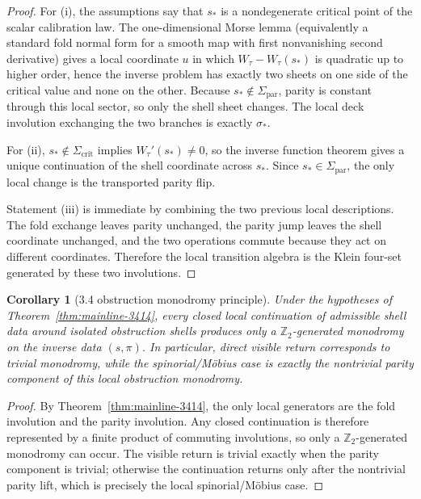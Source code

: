 \documentclass[12pt,a4paper]{article}
\newtheorem{corollary}[theorem]{Corollary}
\begin{document}
\begin{proof}
For (i), the assumptions say that $s_\ast$ is a nondegenerate critical point of the scalar calibration law. The one-dimensional Morse lemma (equivalently a standard fold normal form for a smooth map with first nonvanishing second derivative) gives a local coordinate $u$ in which $W_\tau-W_\tau(s_\ast)$ is quadratic up to higher order, hence the inverse problem has exactly two sheets on one side of the critical value and none on the other. Because $s_\ast\notin \Sigma_{\mathrm{par}}$, parity is constant through this local sector, so only the shell sheet changes. The local deck involution exchanging the two branches is exactly $\sigma_\ast$.

For (ii), $s_\ast\notin \Sigma_{\mathrm{crit}}$ implies $W_\tau'(s_\ast)\neq 0$, so the inverse function theorem gives a unique continuation of the shell coordinate across $s_\ast$. Since $s_\ast\in \Sigma_{\mathrm{par}}$, the only local change is the transported parity flip.

Statement (iii) is immediate by combining the two previous local descriptions. The fold exchange leaves parity unchanged, the parity jump leaves the shell coordinate unchanged, and the two operations commute because they act on different coordinates. Therefore the local transition algebra is the Klein four-set generated by these two involutions.
\end{proof}

\begin{corollary}[3.4 obstruction monodromy principle]
\label{cor:mainline-3414}
Under the hypotheses of Theorem~\ref{thm:mainline-3414}, every closed local continuation of admissible shell data around isolated obstruction shells produces only a $\mathbb Z_2$-generated monodromy on the inverse data $(s,\pi)$. In particular, direct visible return corresponds to trivial monodromy, while the spinorial/M\"obius case is exactly the nontrivial parity component of this local obstruction monodromy.
\end{corollary}

\begin{proof}
By Theorem~\ref{thm:mainline-3414}, the only local generators are the fold involution and the parity involution. Any closed continuation is therefore represented by a finite product of commuting involutions, so only a $\mathbb Z_2$-generated monodromy can occur. The visible return is trivial exactly when the parity component is trivial; otherwise the continuation returns only after the nontrivial parity lift, which is precisely the local spinorial/M\"obius case.
\end{proof}
\end{document}
